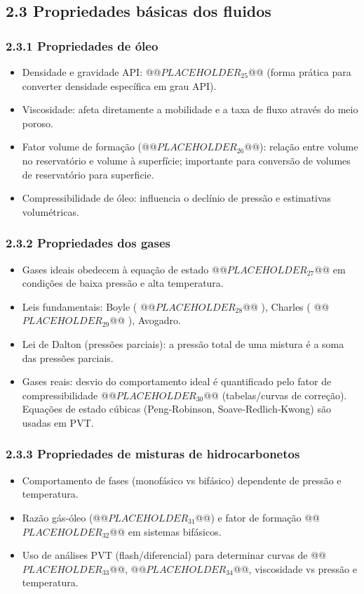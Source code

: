\documentclass[11pt,a4paper]{article}
\begin{document}
\subsection{2.3 Propriedades básicas dos fluidos}

\subsubsection{2.3.1 Propriedades de óleo}
\begin{itemize}
\item Densidade e gravidade API: @@$PLACEHOLDER_{25}$@@ (forma prática para converter densidade específica em grau API).
\item Viscosidade: afeta diretamente a mobilidade e a taxa de fluxo através do meio poroso.
\item Fator volume de formação (@@$PLACEHOLDER_{26}$@@): relação entre volume no reservatório e volume à superfície; importante para conversão de volumes de reservatório para superficie.
\item Compressibilidade de óleo: influencia o declínio de pressão e estimativas volumétricas.
\end{itemize}

\subsubsection{2.3.2 Propriedades dos gases}
\begin{itemize}
\item Gases ideais obedecem à equação de estado @@$PLACEHOLDER_{27}$@@ em condições de baixa pressão e alta temperatura.
\item Leis fundamentais: Boyle ( @@$PLACEHOLDER_{28}$@@ ), Charles ( @@$PLACEHOLDER_{29}$@@ ), Avogadro.
\item Lei de Dalton (pressões parciais): a pressão total de uma mistura é a soma das pressões parciais.
\item Gases reais: desvio do comportamento ideal é quantificado pelo fator de compressibilidade @@$PLACEHOLDER_{30}$@@ (tabelas/curvas de correção). Equações de estado cúbicas (Peng‑Robinson, Soave‑Redlich‑Kwong) são usadas em PVT.
\end{itemize}

\subsubsection{2.3.3 Propriedades de misturas de hidrocarbonetos}
\begin{itemize}
\item Comportamento de fases (monofásico vs bifásico) dependente de pressão e temperatura.
\item Razão gás‑óleo (@@$PLACEHOLDER_{31}$@@) e fator de formação @@$PLACEHOLDER_{32}$@@ em sistemas bifásicos.
\item Uso de análises PVT (flash/diferencial) para determinar curvas de @@$PLACEHOLDER_{33}$@@, @@$PLACEHOLDER_{34}$@@, viscosidade vs pressão e temperatura.
\end{itemize}
\end{document}
